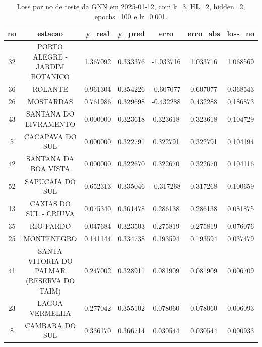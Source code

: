 \begin{table}[h]
\centering
\caption{Loss por no de teste da GNN em 2025-01-12, com k=3, HL=2, hidden=2, epochs=100 e lr=0.001.}
\label{tab:gnn_loss_k3_hl2_h2_e100_d20250112}
\begin{tabular}{ccccccc}
\toprule
no & estacao & y\_real & y\_pred & erro & erro\_abs & loss\_no \\
\midrule
32 & PORTO ALEGRE - JARDIM BOTANICO & 1.367092 & 0.333376 & -1.033716 & 1.033716 & 1.068569 \\
36 & ROLANTE & 0.961304 & 0.354226 & -0.607077 & 0.607077 & 0.368543 \\
26 & MOSTARDAS & 0.761986 & 0.329698 & -0.432288 & 0.432288 & 0.186873 \\
43 & SANTANA DO LIVRAMENTO & 0.000000 & 0.323618 & 0.323618 & 0.323618 & 0.104729 \\
5 & CACAPAVA DO SUL & 0.000000 & 0.322791 & 0.322791 & 0.322791 & 0.104194 \\
42 & SANTANA DA BOA VISTA & 0.000000 & 0.322670 & 0.322670 & 0.322670 & 0.104116 \\
52 & SAPUCAIA DO SUL & 0.652313 & 0.335046 & -0.317268 & 0.317268 & 0.100659 \\
13 & CAXIAS DO SUL - CRIUVA & 0.075340 & 0.361478 & 0.286138 & 0.286138 & 0.081875 \\
35 & RIO PARDO & 0.047684 & 0.323503 & 0.275819 & 0.275819 & 0.076076 \\
25 & MONTENEGRO & 0.141144 & 0.334738 & 0.193594 & 0.193594 & 0.037479 \\
41 & SANTA VITORIA DO PALMAR (RESERVA DO TAIM) & 0.247002 & 0.328911 & 0.081909 & 0.081909 & 0.006709 \\
23 & LAGOA VERMELHA & 0.277042 & 0.355102 & 0.078060 & 0.078060 & 0.006093 \\
8 & CAMBARA DO SUL & 0.336170 & 0.366714 & 0.030544 & 0.030544 & 0.000933 \\
\bottomrule
\end{tabular}
\end{table}
